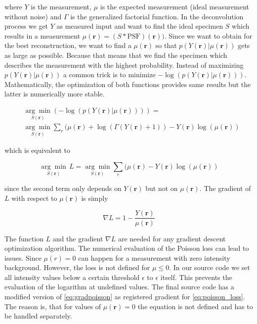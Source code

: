 \documentclass{juliacon}
\begin{document}
where $Y$ is the measurement, $\mu$ is the expected measurement (ideal measurement without noise) and $\Gamma$ is the generalized factorial function.
In the deconvolution process we get $Y$ as measured input and want to find the ideal specimen $S$ which results in a measurement $\mu(\mathbf r) = (S * \text{PSF})(\mathbf r))$.
Since we want to obtain for the best reconstruction, we want to find a $\mu(\mathbf r)$ so that $p(Y(\mathbf r) | \mu(\mathbf r))$ gets as large as possible. Because that means
that we find the specimen which describes the measurement with the highest probability.
Instead of maximizing $p(Y(\mathbf r) | \mu(\mathbf r))$ a common trick is to minimize $- \log(p(Y(\mathbf r)|\mu(\mathbf r)))$. 
Mathematically, the optimization of both functions provides same results but the latter is numerically more stable.

\begin{align}
&\underset{S(\mathbf r)}{\arg \min} (- \log(p(Y(\mathbf r)|\mu(\mathbf r)))) =\\ &\underset{S(\mathbf r)}{\arg \min} \sum_r (\mu(\mathbf r) + \log(\Gamma(Y(\mathbf r) + 1)) - Y(\mathbf r) \log(\mu(\mathbf r))
\end{align}

which is equivalent to

\begin{equation}
    \underset{S(\mathbf r)}{\arg \min}\, L = \underset{S(\mathbf r)}{\arg \min} \sum_r (\mu(\mathbf r)  - Y(\mathbf r) \log(\mu(\mathbf r))
    \label{eq:poisson_loss}
\end{equation}

since the second term only depends on $Y(\mathbf r)$ but not on $\mu(\mathbf r)$.
The gradient of $L$ with respect to $\mu(\mathbf r)$ is simply

\begin{equation}
    \nabla L = 1 - \frac{Y(\mathbf r)}{\mu(\mathbf r)}
    \label{eq:gradpoisson}
\end{equation}

The function $L$ and the gradient $\nabla L$ are needed for any gradient descent optimization algorithm.
The numerical evaluation of the Poisson loss can lead to issues. Since $\mu(r)=0$ can happen for a measurement with zero intensity background. However, the loss is not defined for $\mu \leq 0$. In our source code we set all intensity values below a certain threshold $\epsilon$ to $\epsilon$ itself. This prevents the evaluation of the logarithm at undefined values.
The final source code has a modified version of \autoref{eq:gradpoisson} as registered gradient for \autoref{eq:poisson_loss}.
The reason is, that for values of $\mu(\mathbf r) = 0$ the equation is not defined and has to be handled separately. 
\end{document}
